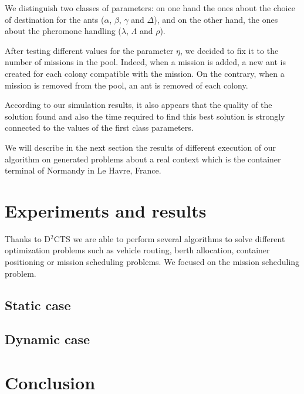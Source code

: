 \documentclass[a4paper,10pt]{article}
\begin{document}
We distinguish two classes of parameters: on one hand the ones about the choice of destination for the ants ($\alpha$, $\beta$, $\gamma$ and $\Delta$), and on the other hand, the ones about the pheromone handling ($\lambda$, $\Lambda$ and $\rho$).

After testing different values for the parameter $\eta$, we decided to fix it to the number of missions in the pool. Indeed, when a mission is added, a new ant is created for each colony compatible with the mission. On the contrary, when a mission is removed from the pool, an ant is removed of each colony.

According to our simulation results, it also appears that the quality of the solution found and also the time required to find this best solution is strongly connected to the values of the first class parameters.

We will describe in the next section the results of different execution of our algorithm on generated problems about a real context which is the container terminal of Normandy in Le Havre, France.

\section{Experiments and results}

Thanks to D$^2$CTS we are able to perform several algorithms to solve different optimization problems such as vehicle routing, berth allocation, container positioning or mission scheduling problems. We focused on the mission scheduling problem.

\subsection{Static case}
\subsection{Dynamic case}

\section{Conclusion}



\end{document}
